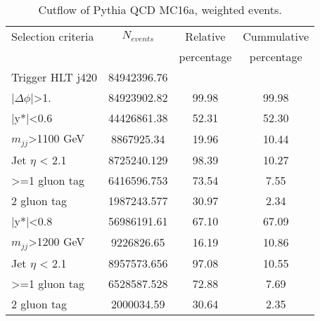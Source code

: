 \begin{table}[ht]
\begin{center}
\begin{tabular}{|l|c|c|c|}
\hline
Selection criteria & $N_{events}$ & Relative & Cummulative  \\
 & & percentage & percentage \\
\hline
Trigger HLT j420 & 84942396.76 &  &  \\
$|\Delta\phi|$>1. & 84923902.82 & 99.98 & 99.98 \\
\hline\hline
|y*|<0.6 & 44426861.38 & 52.31 & 52.30 \\
$m_{jj}$>1100 GeV & 8867925.34 & 19.96 & 10.44 \\
Jet $\eta$ < 2.1 & 8725240.129 & 98.39 & 10.27 \\
>=1 gluon tag & 6416596.753 & 73.54 & 7.55 \\
2 gluon tag & 1987243.577 & 30.97 & 2.34 \\
\hline\hline
|y*|<0.8 & 56986191.61 & 67.10 & 67.09 \\
$m_{jj}$>1200 GeV & 9226826.65 & 16.19 & 10.86 \\
Jet $\eta$ < 2.1 & 8957573.656 & 97.08 & 10.55 \\
>=1 gluon tag & 6528587.528 & 72.88 & 7.69 \\
2 gluon tag & 2000034.59 & 30.64 & 2.35 \\
\hline
\end{tabular}
\end{center}
\caption{Cutflow of Pythia QCD MC16a, weighted events.}
\label{tab:bckgdcutflowMC16aWeighted}
\end{table}

